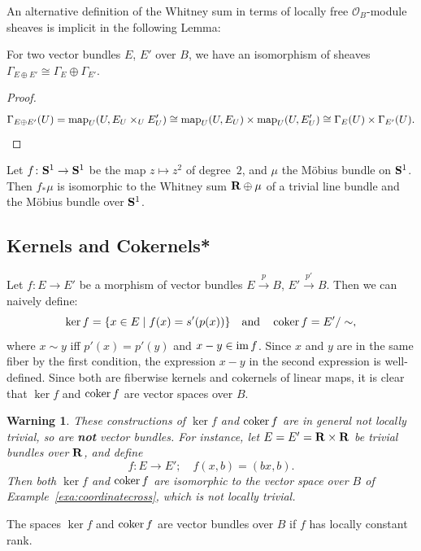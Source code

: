 \documentclass[a4paper,openany]{scrbook}
\newtheorem{warning}[equation]{Warning}
\begin{document}
An alternative definition of the Whitney sum in terms of locally free $\mathcal O_B$-module sheaves is implicit in the following Lemma:

\begin{lemma}
For two vector bundles $E$, $E'$ over $B$, we have an isomorphism of sheaves $\Gamma_{E \oplus E'} \cong \Gamma_E \oplus \Gamma_{E'}$.
\end{lemma}
\begin{proof}
\[
\Gamma_{E \oplus E'}(U) = \map_U(U,E_U \times_U E'_U) \cong \map_U(U,E_U) \times \map_U(U,E'_U) \cong \Gamma_E(U) \times \Gamma_{E'}(U).
\]
\end{proof}

\begin{exer}
Let $f\colon \S^1 \to \S^1$ be the map $z \mapsto z^2$ of degree~$2$, and $\mu$ the Möbius bundle on $\S^1$. Then $f_*\mu$ is isomorphic to the Whitney sum $\R \oplus \mu$ of a trivial line bundle and the Möbius bundle over $\S^1$.
\end{exer}

\subsection{Kernels and Cokernels*}

Let $f\colon E \to E'$ be a morphism of vector bundles $E \xrightarrow{p} B$, $E' \xrightarrow{p'} B$. Then we can naively define:
\[
\ker f = \{x \in E \mid f(x)=s'(p(x))\} \quad \text{and} \quad \coker f = E'/\sim,
\]
where $x \sim y$ iff $p'(x) = p'(y)$ and $x-y \in \im f$. Since $x$ and $y$ are in the same fiber by the first condition, the expression $x-y$ in the second expression is well-defined. Since both are fiberwise kernels and cokernels of linear maps, it is clear that $\ker f$ and $\coker f$ are vector spaces over $B$.

\begin{warning}
These constructions of $\ker f$ and $\coker f$ are in general not locally trivial, so are \textbf{not} vector bundles. For instance, let $E=E'=\R\times \R$ be trivial bundles over $\R$, and define
\[
f\colon E \to E'; \quad f(x,b) = (bx,b).
\]
Then both $\ker f$ and $\coker f$ are isomorphic to the vector space over $B$ of Example~\ref{exa:coordinatecross}, which is not locally trivial.
\end{warning}


\begin{exer}
The spaces $\ker f$ and $\coker f$ are vector bundles over $B$ if $f$ has locally constant rank.
\end{exer}
\end{document}
